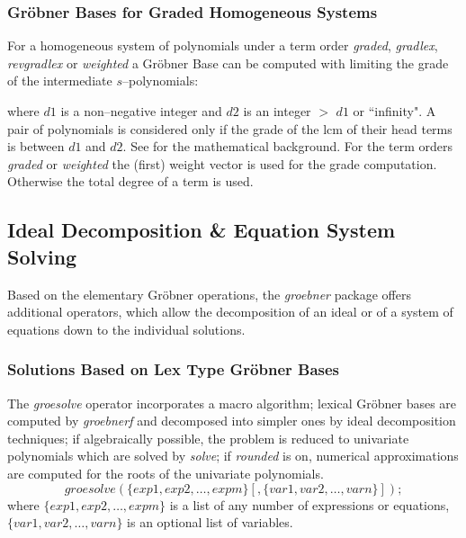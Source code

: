 \subsubsection{Gr\"obner Bases for Graded Homogeneous Systems}

For a homogeneous system of polynomials under a term order
{\it graded}, {\it gradlex}, {\it revgradlex} or {\it weighted}
a Gr\"obner Base can be computed with limiting the grade
of the intermediate $s$--polynomials:
\begin{description}
\item[{\it dd\_groebner}($d1,d2,\{p_1,p_2,\ldots\}$);]
\end{description}
where $d1$ is a non--negative integer and $d2$ is an integer
$>$ $d1$ or ``infinity". A pair of polynomials is considered
only if the grade of the lcm of their head terms is between
$d1$ and $d2$. See \cite{Becker:93} for the mathematical background.
For the term orders {\it graded} or {\it weighted} the (first) weight
vector is used for the grade computation. Otherwise the total
degree of a term is used.

\subsection{Ideal Decomposition \& Equation System Solving}
Based on the elementary Gr\"obner operations, the \emph{groebner} package offers
additional operators, which allow the decomposition of an ideal or of a
system of equations down to the individual solutions.

\subsubsection{Solutions Based on Lex Type Gr\"obner Bases}

 
The \emph{groesolve} operator incorporates a macro algorithm;
lexical Gr\"obner bases are computed by \emph{groebnerf} and decomposed
into simpler ones by ideal decomposition techniques; if algebraically
possible, the problem is reduced to univariate polynomials which are
solved by \emph{solve}; if \emph{rounded} is on, numerical approximations are
computed for the roots of the univariate polynomials.
\[
 groesolve(\{exp1, exp2, \ldots , expm\}[,\{var1, var2, \ldots ,
varn\}]); \]
where $\{exp1, exp2,\ldots , expm\}$ is a list of any number of
expressions or equations, $\{var1, var2, \ldots , varn\}$ is an
optional list of variables.

